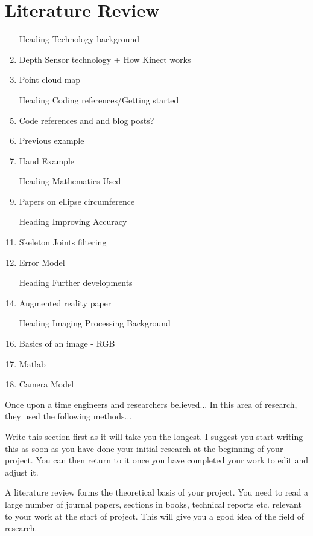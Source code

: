 \chapter{Literature Review}

\begin{enumerate}
	\item[Heading] Technology background
	\item Depth Sensor technology + How Kinect works
	\item Point cloud map
	
	\item [Heading] Coding references/Getting started
	\item Code references and and blog posts? 
	\item Previous example
	\item Hand Example
	
	\item [Heading] Mathematics Used
	\item Papers on ellipse circumference
	
	\item [Heading] Improving Accuracy
	\item Skeleton Joints filtering
	\item Error Model
	
	\item [Heading] Further developments
	\item Augmented reality paper
	
	\item [Heading] Imaging Processing Background
	\item Basics of an image - RGB
	\item Matlab
	\item Camera Model
\end{enumerate}

Once upon a time engineers and researchers believed... In this area of research, they used the following methods... \cite{jct2010}

Write this section first as it will take you the longest. I suggest you start writing this as soon as you
have done your initial research at the beginning of your project. You can then return to it once you
have completed your work to edit and adjust it.

A literature review forms the theoretical basis of your project. You need to read a large number of
journal papers, sections in books, technical reports etc. relevant to your work at the start of project.
This will give you a good idea of the field of research.

